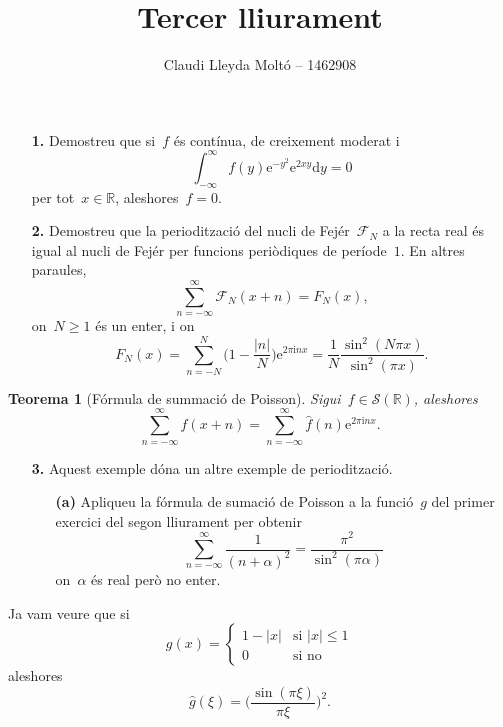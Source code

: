 \documentclass[a4paper]{article}
\title{Tercer lliurament}
\author{Claudi Lleyda Moltó -- 1462908}
\theoremstyle{plain}
\newtheorem{theorem}{Teorema}
\newcommand{\iu}{\mathrm{i}}
\newcommand{\e}{\mathrm{e}}
\providecommand{\uppi}{\pi}
\newcommand{\diff}{\mathrm{d}}
\newcommand{\abs}[1]{\lvert{#1}\rvert}
\newcommand{\F}{\mathcal{F}}
\begin{document}
\maketitle

\begin{enumerate}
    \item[\textbf{1.}] Demostreu que si~\(f\) és contínua, de creixement moderat
        i
        \[
            \int_{-\infty}^{\infty}f(y)\e^{-y^{2}}\e^{2xy}\diff y=0
        \]
        per tot~\(x\in\mathbb{R}\), aleshores~\(f=0\).
\end{enumerate}

\begin{enumerate}
    \item[\textbf{2.}] Demostreu que la periodització del nucli de
        Fejér~\(\F_{N}\) a la recta real és igual al nucli de Fejér per funcions
        periòdiques de període~\(1\).
        En altres paraules,
        \[
            \sum_{n=-\infty}^{\infty} \F_{N}(x+n)
            = F_{N}(x),
        \]
        on~\(N\geq1\) és un enter, i on
        \[
            F_{N}(x) = \sum_{n=-N}^{N} \biggl(1 - \frac{\abs{n}}{N}\biggr)
            \e^{2\uppi\iu nx}
            = \frac{1}{N}\frac{\sin^{2}(N\uppi x)}{\sin^{2}(\uppi x)}.
        \]
\end{enumerate}

\begin{theorem}[Fórmula de summació de Poisson]
    Sigui~\(f\in\mathcal{S}(\mathbb{R})\), aleshores
    \[
        \sum_{n=-\infty}^{\infty} f(x+n)
        = \sum_{n=-\infty}^{\infty} \widehat{f}(n) \e^{2\uppi\iu nx}.
    \]
\end{theorem}

\begin{enumerate}
    \item[\textbf{3.}] Aquest exemple dóna un altre exemple de periodització.
        \begin{enumerate}
            \item[\textbf{(a)}] Apliqueu la fórmula de sumació de Poisson a la
                funció~\(g\) del primer exercici del segon lliurament per
                obtenir
                \[
                    \sum_{n=-\infty}^{\infty} \frac{1}{(n+\alpha)^{2}}
                    = \frac{\uppi^{2}}{\sin^{2}(\uppi\alpha)}
                \]
                on~\(\alpha\) és real però no enter.
        \end{enumerate}
\end{enumerate}

Ja vam veure que si
\[
    g(x) = \begin{cases}
        1 - \abs{x} & \text{si } \abs{x} \leq 1 \\
        0 & \text{si no}
    \end{cases}
\]
aleshores
\[
    \widehat{g}(\xi) = \biggl(\frac{\sin(\uppi\xi)}{\uppi\xi}\biggr)^{2}.
\]
\end{document}
